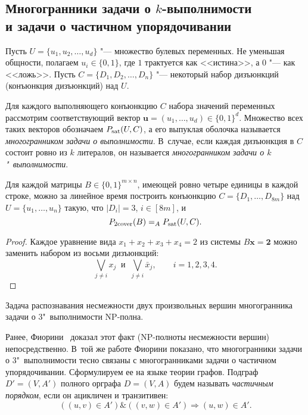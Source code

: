 \subsection[Многогранники задачи о k-выполнимости и задачи о частичном упорядочивании]{Многогранники задачи о $k$-выполнимости\\ и задачи о частичном упорядочивании}
\label{subsec:k-Sat&POP}

Пусть $U = \{u_1, u_2, \ldots, u_d\}$ "--- множество булевых переменных.
Не уменьшая общности, полагаем $u_i \in \{0, 1\}$, где $1$ трактуется как <<истина>>, а $0$ "--- как <<ложь>>.
Пусть $C = \{D_1, D_2, \ldots, D_n\}$ "--- некоторый набор дизъюнкций
(конъюнкция дизъюнкций) над $U$.

Для каждого выполняющего конъюнкцию $C$ набора значений переменных
рассмотрим соответствующий вектор $\bm{u} = (u_1, \dots, u_d)\in\{0,1\}^d$.
Множество всех таких векторов обозначаем $P_{\textup{sat}}(U,C)$,
а его выпуклая оболочка называется \emph{многогранником задачи о выполнимости}.
В~случае, если каждая дизъюнкция в $C$  состоит ровно из $k$ литералов, он называется \emph{многогранником задачи о $k$"~выполнимости}.
 
\begin{theorem}
\label{thm:DCPSAT}
Для каждой матрицы $B \in \{0,1\}^{m\times n}$, имеющей ровно четыре единицы в каждой строке, можно за линейное время построить конъюнкцию $C = \{D_1,\dots, D_{8m}\}$ над $U = \{u_1,\dots, u_n\}$ такую, что $|D_i|=3$, $i \in [8m]$, и 
\[
P_{\textup{2cover}}(B) =_A P_{\textup{sat}}(U,C).
\]
\end{theorem}

\begin{proof}
Каждое уравнение вида $x_1 + x_2 + x_3 + x_4 = 2$ из системы $B \bm{x} = \bm{2}$ можно заменить набором из восьми дизъюнкций: 
\[
\bigvee_{j\neq i} x_j \ \mbox{ и } \ \bigvee_{j\neq i} \bar{x}_j, 
\qquad i=1,2,3,4.
\]
\end{proof}
\begin{corollary}
Задача распознавания несмежности двух произвольных вершин многогранника задачи о 3"~выполнимости NP-полна.
\end{corollary}

Ранее, Фиорини~\cite{Fiorini:2003} доказал этот факт (NP-полноты несмежности вершин) непосредственно. 
В~той же работе Фиорини показано, что многогранники задачи о 3"~выполнимости тесно связаны с многогранниками задачи о частичном упорядочивании.
Сформулируем ее на языке теории графов. 
Подграф $D' = (V, A')$ полного орграфа $D = (V, A)$ будем называть \emph{\hypertarget{def:POP}{частичным порядком}}, если он ацикличен и транзитивен:
\[
((u, v)\in A') \& ((v, w)\in A') \Rightarrow (u, w)\in A'.
\]

